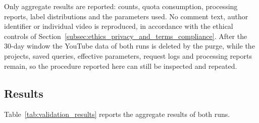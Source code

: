 Only aggregate results are reported: counts, quota consumption, processing reports, label distributions and the parameters used. No comment text, author identifier or individual video is reproduced, in accordance with the ethical controls of Section~\ref{subsec:ethics_privacy_and_terms_compliance}. After the 30-day window the YouTube data of both runs is deleted by the purge, while the projects, saved queries, effective parameters, request logs and processing reports remain, so the procedure reported here can still be inspected and repeated.

\subsection{Results}

Table~\ref{tab:validation_results} reports the aggregate results of both runs.

